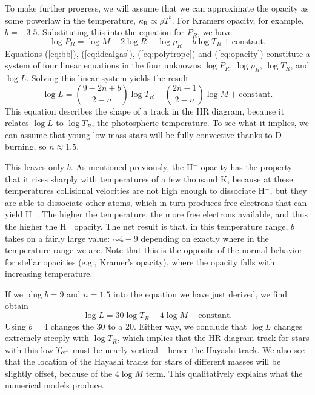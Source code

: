 To make further progress, we will assume that we can approximate the opacity as some powerlaw in the temperature, $\kappa_{\mathrm{R}} \propto \rho T^b$. For Kramers opacity, for example, $b=-3.5$. Substituting this into the equation for $P_R$, we have
\begin{equation}
\label{eq:opacity}
\log P_R = \log M - 2\log R - \log \rho_R - b\log T_R + \mbox{constant}.
\end{equation}
Equations (\ref{eq:bb}), (\ref{eq:idealgas}), (\ref{eq:polytrope}) and (\ref{eq:opacity}) constitute a system of four linear equations in the four unknowns $\log P_R$, $\log \rho_R$, $\log T_R$, and $\log L$. Solving this linear system yields the result
\begin{equation}
\log L = \left(\frac{9 - 2 n + b}{2-n}\right) \log T_R - \left(\frac{2n-1}{2-n}\right) \log M + \mbox{constant}.
\end{equation}
This equation describes the shape of a track in the HR diagram, because it relates $\log L$ to $\log T_R$, the photospheric temperature. To see what it implies, we can assume that young low mass stars will be fully convective thanks to D burning, so $n\approx 1.5$.

This leaves only $b$. As mentioned previously, the H$^{-}$ opacity has the property that it rises sharply with temperatures of a few thousand K, because at these temperatures collisional velocities are not high enough to dissociate H$^-$, but they are able to dissociate other atoms, which in turn produces free electrons that can yield H$^{-}$. The higher the temperature, the more free electrons available, and thus the higher the H$^{-}$ opacity. The net result is that, in this temperature range, $b$ takes on a fairly large value: $\sim 4-9$ depending on exactly where in the temperature range we are. Note that this is the opposite of the normal behavior for stellar opacities (e.g., Kramer's opacity), where the opacity falls with increasing temperature.

If we plug $b = 9$ and $n=1.5$ into the equation we have just derived, we find obtain
\begin{equation}
\log L = 30\log T_R - 4 \log M + \mbox{constant}.
\end{equation}
Using $b=4$ changes the 30 to a 20. Either way, we conclude that $\log L$ changes extremely steeply with $\log T_R$, which implies that the HR diagram track for stars with this low $T_{\rm eff}$ must be nearly vertical -- hence the Hayashi track. We also see that the location of the Hayashi tracks for stars of different masses will be slightly offset, because of the $4\log M$ term. This qualitatively explains what the numerical models produce.

